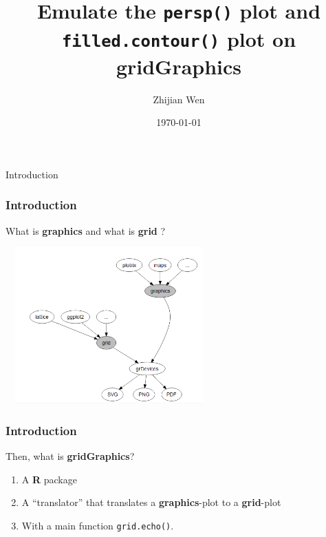 \documentclass{beamer}
\title[]{
Emulate the \texttt{persp()} plot and \texttt{filled.contour()} plot on \textbf{gridGraphics}
} %
\author{Zhijian Wen} %
\institute[UOA] %
{
University of Auckland \\ %
\medskip
\textit{jwen246@aucklanduni.ac.nz} %
}
\date{\today} %
\begin{document}


\begin{frame}
\titlepage %
\end{frame}




\begin{frame}[fragile]
\begin{center}
  \Huge Introduction
\end{center}
\end{frame}


\begin{frame}[fragile]

\frametitle{Introduction}
What is \textbf{graphics} and what is \textbf{grid} ?
\begin{center}
\includegraphics[width = 8cm, height = 6cm]{plot/grid_and_graphics.PNG}
\end{center}

\end{frame}


\begin{frame}[fragile]
\frametitle{Introduction}
Then, what is \textbf{gridGraphics}? \\

\begin{enumerate}
	\item A \textbf{R} package 
	\item A ``translator'' that translates a \textbf{graphics}-plot to a \textbf{grid}-plot 
	\item With a main function \texttt{grid.echo()}.
\end{enumerate}

\end{frame}
\end{document}
